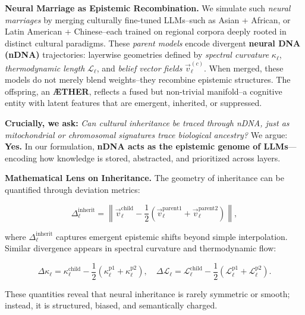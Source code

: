 \vspace{0.8em}
\noindent\textbf{Neural Marriage as Epistemic Recombination.}
We simulate such \emph{neural marriages} by merging culturally fine-tuned LLMs--such as Asian + African, or Latin American + Chinese--each trained on regional corpora deeply rooted in distinct cultural paradigms. These \emph{parent models} encode divergent \textbf{neural DNA (nDNA)} trajectories: layerwise geometries defined by \emph{spectral curvature} $\kappa_\ell$, \emph{thermodynamic length} $\mathcal{L}_\ell$, and \emph{belief vector fields} $\vec{v}_\ell^{(c)}$. When merged, these models do not merely blend weights--they recombine epistemic structures. The offspring, an \textbf{\AE{}THER}, reflects a fused but non-trivial manifold--a cognitive entity with latent features that are emergent, inherited, or suppressed.

\textbf{Crucially, we ask:} \emph{Can cultural inheritance be traced through nDNA, just as mitochondrial or chromosomal signatures trace biological ancestry?} We argue: \textbf{Yes.} In our formulation, \textbf{nDNA acts as the epistemic genome of LLMs}---encoding how knowledge is stored, abstracted, and prioritized across layers.

\vspace{0.8em}
\noindent\textbf{Mathematical Lens on Inheritance.}
The geometry of inheritance can be quantified through deviation metrics:

$$
\Delta_\ell^{\text{inherit}} = \left\| \vec{v}^{\text{child}}_\ell - \frac{1}{2} \left( \vec{v}^{\text{parent1}}_\ell + \vec{v}^{\text{parent2}}_\ell \right) \right\|,
$$

where $\Delta_\ell^{\text{inherit}}$ captures emergent epistemic shifts beyond simple interpolation. Similar divergence appears in spectral curvature and thermodynamic flow:

$$
\Delta \kappa_\ell = \kappa_\ell^{\text{child}} - \frac{1}{2}\left(\kappa_\ell^{\text{p1}} + \kappa_\ell^{\text{p2}}\right), \quad
\Delta \mathcal{L}_\ell = \mathcal{L}_\ell^{\text{child}} - \frac{1}{2}\left(\mathcal{L}_\ell^{\text{p1}} + \mathcal{L}_\ell^{\text{p2}}\right).
$$

These quantities reveal that neural inheritance is rarely symmetric or smooth; instead, it is structured, biased, and semantically charged.

\vspace{0.8em}
